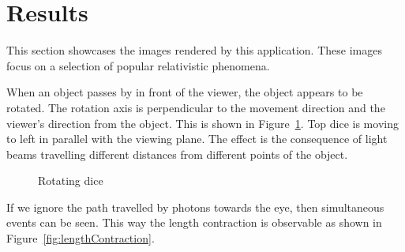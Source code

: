 \documentclass{egpubl}
\begin{document}
\section{Results}
\label{sec:results}
This section showcases the images rendered by this application. These images focus on a selection of popular relativistic phenomena.

When an object passes by in front of the viewer, the object appears to be rotated. The rotation axis is perpendicular to the movement direction and the viewer's direction from the object. This is shown in Figure~\ref{fig:RotatingDice}. Top dice is moving to left in parallel with the viewing plane. The effect is the consequence of light beams travelling different distances from different points of the object.

\begin{figure}[h]
\center
{}
\caption{Rotating dice}
\label{fig:RotatingDice}
\end{figure}

If we ignore the path travelled by photons towards the eye, then simultaneous events can be seen. This way the length contraction is observable as shown in Figure~\ref{fig:lengthContraction}.
\end{document}
